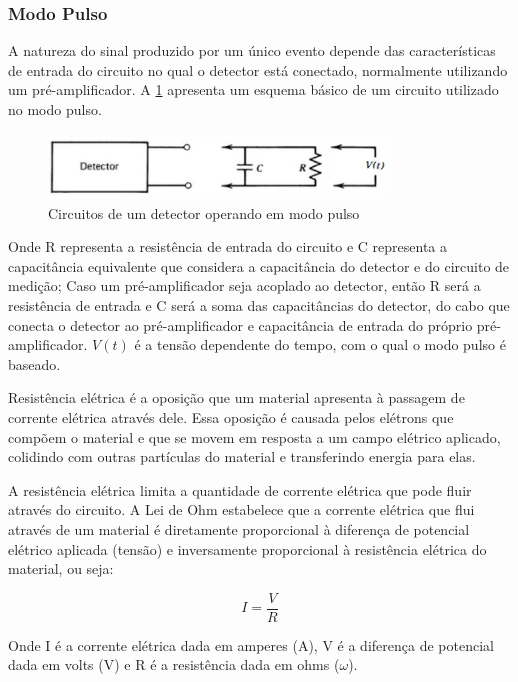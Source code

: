 \documentclass[11pt,a4paper]{article}
\begin{document}
		\subsubsection{Modo Pulso}

			A natureza do sinal produzido por um único evento depende das características de entrada do circuito no qual o detector está conectado, normalmente utilizando um pré-amplificador. A  \ref{fig:esquemaModoPulso} apresenta um esquema básico de um circuito utilizado no modo pulso. 

				\begin{figure}[h]
					\centering
					\includegraphics[width=0.8\textwidth]{Imagens/esquemaModoPulso.jpg}
					\caption{Circuitos de um detector operando em modo pulso}
					\label{fig:esquemaModoPulso}
				\end{figure}

			\noindent Onde R representa a resistência de entrada do circuito e C representa a capacitância equivalente que considera a capacitância do detector e do circuito de medição; Caso um pré-amplificador seja acoplado ao detector, então R será a resistência de entrada e C será a soma das capacitâncias do detector, do cabo que conecta o detector ao pré-amplificador e capacitância de entrada do próprio pré-amplificador. $V(t)$ é a tensão dependente do tempo, com o qual o modo pulso é baseado. 

			Resistência elétrica é a oposição que um material apresenta à passagem de corrente elétrica através dele. Essa oposição é causada pelos elétrons que compõem o material e que se movem em resposta a um campo elétrico aplicado, colidindo com outras partículas do material e transferindo energia para elas. 

			A resistência elétrica limita a quantidade de corrente elétrica que pode fluir através do circuito. A Lei de Ohm estabelece que a corrente elétrica que flui através de um material é diretamente proporcional à diferença de potencial elétrico aplicada (tensão) e inversamente proporcional à resistência elétrica do material, ou seja:

				\begin{equation}
					I = \frac{V}{R}
				\end{equation}

			\noindent Onde I é a corrente elétrica dada em amperes (A), V é a diferença de potencial dada em volts (V) e R é a resistência dada em ohms ($\omega$).
\end{document}
